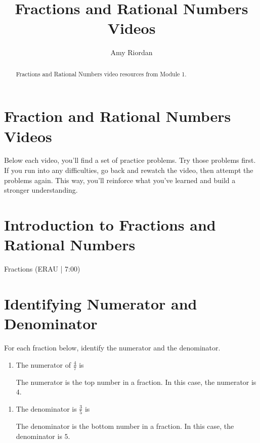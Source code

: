 \documentclass{ximera}
\title{Fractions and Rational Numbers Videos}
\author{Amy Riordan}
\begin{document}
\begin{abstract}
Fractions and Rational Numbers video resources from Module 1.
\end{abstract}
\maketitle

\section*{Fraction and Rational Numbers Videos}

Below each video, you’ll find a set of practice problems. Try those problems first. If you run into any difficulties, go back and rewatch the video, then attempt the problems again. This way, you’ll reinforce what you’ve learned and build a stronger understanding.

\section*{Introduction to Fractions and Rational Numbers}

Fractions (ERAU | 7:00)



\section*{Identifying Numerator and Denominator}

For each fraction below, identify the numerator and the denominator.

\begin{problem}
\begin{enumerate}
\item The numerator of $\frac{4}{7}$ is 
\begin{feedback}
The numerator is the top number in a fraction. In this case, the numerator is $4$.
\end{feedback}

\end{enumerate}
\end{problem}

\begin{problem}
\begin{enumerate}
\item The denominator is $\frac{3}{5}$ is 
\begin{feedback}
The denominator is the bottom number in a fraction. In this case, the denominator is $5$.
\end{feedback}

\end{enumerate}
\end{problem}
\end{document}
